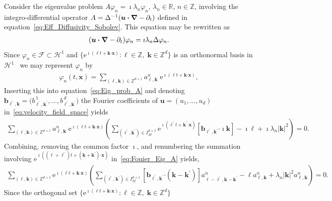 \documentclass[leqno,onefignum,onetabnum]{siamltex1213}
\newcommand{\e}{\mathrm{e}}
\newcommand{\Hs}{\mathscr{H}}
\newcommand{\Fs}{\mathscr{F}}
\newcommand\bnabla{\mbox{\boldmath${\nabla}$}}
\providecommand\bcdot{\boldsymbol{\cdot}}
\newcommand{\vecb}{\boldsymbol{b}}
\newcommand{\vecx}{\boldsymbol{x}}
\newcommand{\vecu}{\boldsymbol{u}}
\newcommand{\veck}{\boldsymbol{k}}
\begin{document}
Consider the eigenvalue problem $A\varphi_n=\imath\lambda_n\varphi_n$, $\lambda_n\in\mathbb{R}$,
$n\in\mathbb{Z}$, involving the integro-differential operator 
$A=\Delta^{-1}(\vecu \bcdot\bnabla -\partial_t)$ defined in
equation~\eqref{eq:Eff_Diffusivity_Sobolev}. This equation may be
rewritten as       
%
\begin{align}\label{eq:Eig_prob_A}
  (\vecu \bcdot\bnabla -\partial_t)\varphi_n=\imath\lambda_n\Delta\varphi_n.
\end{align}
%
Since $\varphi_n\in\Fs\subset\Hs^1$ and
$\{\e^{\imath(\ell t+\veck\bcdot\vecx)}:\ell\in\mathbb{Z},\;\veck\in\mathbb{Z}^d\}$ 
is an orthonormal basis in $\Hs^1$~\cite{Folland:99:RealAnalysis} we may represent
$\varphi_n$ by
% 
\begin{align}\label{eq:Fourier_Eig_fun}
  \varphi_n(t,\vecx)=\sum_{(\ell,\veck)\in\mathbb{Z}^{d+1}}a^n_{\ell,\veck}\;\e^{\imath(\ell t+\veck\bcdot\vecx)},
\end{align}
%
Inserting this into equation~\eqref{eq:Eig_prob_A} and denoting 
$\vecb_{\ell^\prime,\veck}=\big(b^{\,1}_{\ell^\prime,\veck^\prime},\ldots,b^{\,d}_{\ell^\prime,\veck^\prime}\big)$
the Fourier coefficients of $\vecu =(u_1,\ldots,u_d)$
in~\eqref{eq:velocity_field_space} yields    
%
\begin{align}\label{eq:Fouier_Eig_A}
  \sum_{(\ell,\veck)\in\mathbb{Z}^{d+1}
  }a^n_{\ell,\veck}\;\e^{\imath(\ell t+\veck\bcdot\vecx)}
  \left(
    \sum_{(\ell^\prime,\veck^\prime)\in I_M^{d+1}}\e^{\imath(\ell^\prime t+\veck^\prime\bcdot\vecx)}
  \left[\vecb_{\ell^\prime,\veck^\prime}\bcdot\imath\veck
       \right]
  -\imath\ell
  +\imath\lambda_n|\veck|^2\right)=0.
\end{align}
%
Combining, removing the common factor $\imath$, and renumbering the summation
involving $\e^{\imath((\ell+\ell^\prime)t+(\veck+\veck^\prime)\bcdot\vecx)}$
in~\eqref{eq:Fouier_Eig_A} yields, 
%
\begin{align}\label{eq:Fouier_Eig_A_resum}
  \sum_{(\ell,\veck)\in\mathbb{Z}^{d+1}}\e^{\imath(\ell t+\veck\bcdot\vecx)}
  \left(
    \sum_{(\ell^\prime,\veck^\prime)\in I_M^{d+1}}
  \left[\vecb_{\ell^\prime,\veck^\prime}\bcdot(\veck-\veck^\prime)
       \right]a^n_{\ell-\ell^\prime,\veck-\veck^\prime}
  -\ell a^n_{\ell,\veck}
  +\lambda_n|\veck|^2a^n_{\ell,\veck}\right)=0.
\end{align}
%
Since the orthogonal set
$\{\e^{\imath(\ell t+\veck\bcdot\vecx)}:\ell\in\mathbb{Z},\;\veck\in\mathbb{Z}^d\}$
\end{document}
